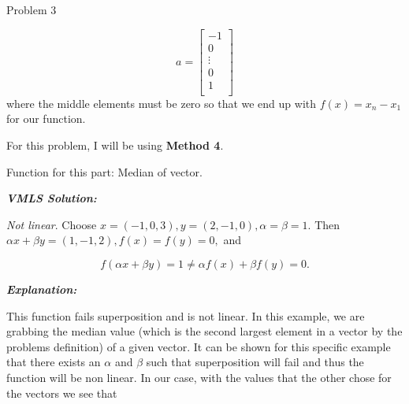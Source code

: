 \begin{problem}{Problem 3}
\begin{Highlight}
        \begin{equation}
            a = 
            \begin{bmatrix}
                - 1 \\
                0 \\
                \vdots \\
                0 \\
                1 \\
            \end{bmatrix}
        \end{equation}
        where the middle elements must be zero so that we end up with $f(x) = x_{n} - x_{1}$ for our function. 
    \end{Highlight}

    \begin{Highlight}
        For this problem, I will be using \textbf{Method 4}. \vspace*{1em}

        Function for this part: Median of vector. \vspace*{1em}

        \textbf{\textit{VMLS Solution:}} \vspace*{1em}

        \textit{Not linear}. Choose $x = (-1,0,3), y = (2,-1,0), \alpha = \beta = 1$. Then $\alpha x + \beta y = (1,-1,2), f(x) = f(y) = 0,$ and

        \begin{equation}
            f(\alpha x + \beta y) = 1 \neq \alpha f(x) + \beta f(y) = 0.
        \end{equation}

        \textbf{\textit{Explanation:}} \vspace*{1em}

        This function fails superposition and is not linear. In this example, we are grabbing the median value (which is the second largest element in a vector by the problems definition)
        of a given vector. It can be shown for this specific example that there exists an $\alpha$ and $\beta$ such that superposition will fail and thus the function will be non linear.
        In our case, with the values that the other chose for the vectors we see that


\end{Highlight}
\end{problem}
